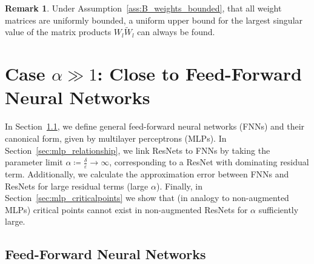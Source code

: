 \documentclass[10pt]{article}
\theoremstyle{definition}
\newtheorem{remark}[theorem]{Remark}
\numberwithin{equation}{section}
\newcommand{\eps}{\varepsilon}
\begin{document}
\begin{remark}
    Under Assumption~\ref{ass:B_weights_bounded}, that all weight matrices are uniformly bounded, a uniform upper bound for the largest singular value of the matrix products $W_l \widetilde{W}_l $ can always be found. %
\end{remark}



\section{Case $\alpha \gg 1$: Close to Feed-Forward Neural Networks}
\label{sec:mlp}

In Section~\ref{sec:mlp_model}, we define general feed-forward neural networks (FNNs) and their canonical form, given by multilayer perceptrons (MLPs). In Section~\ref{sec:mlp_relationship}, we link ResNets to FNNs by taking the parameter limit $\alpha \coloneqq \frac{\delta}{\eps}\rightarrow \infty$, corresponding to a ResNet with dominating residual term. Additionally, we calculate the approximation error between FNNs and ResNets for large residual terms (large $\alpha$). Finally, in Section~\ref{sec:mlp_criticalpoints} we show that (in analogy to non-augmented MLPs) critical points cannot exist in non-augmented ResNets for $\alpha$ sufficiently large. 

\subsection{Feed-Forward Neural Networks}
\label{sec:mlp_model}
\end{document}
